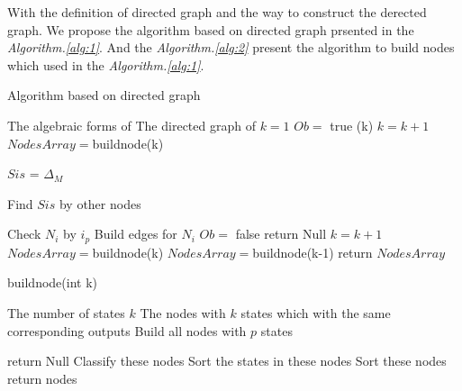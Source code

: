 With the definition of directed graph and the way to construct the derected graph. We propose the algorithm based on directed graph prsented in the {\em Algorithm.\ref{alg:1}}. And the {\em Algorithm.\ref{alg:2}} present the algorithm to build nodes which used in the {\em Algorithm.\ref{alg:1}}.

\begin{algorithm}[h]
\caption{Algorithm based on directed graph}
\begin{algorithmic}[1]
\REQUIRE 
The algebraic forms of \BCN
\ENSURE  
The directed graph of \BCN
\STATE  $k=1$ %
\STATE  $Ob=$ true %
(k)
\STATE $k= k+1$
\STATE $NodesArray=${\sf buildnode}(k)

\STATE $Sis$ = $\Delta_M$ 
\ELSE

\STATE Find $Sis$ by other nodes

\ENDIF
{}
\STATE Check $N_i$ by $i_p$
\STATE Build edges for $N_i$ 
\ENDFOR
{}
\STATE  $Ob=$ false 
\STATE return Null
\ENDIF
\ENDFOR
\STATE $k= k+1$
\STATE $NodesArray=${\sf buildnode}(k)
\ENDWHILE
\STATE $NodesArray=${\sf buildnode}(k-1)
\STATE return $NodesArray$
\end{algorithmic}
 \label{alg:1}
\end{algorithm}
\begin{algorithm}[h!]
\caption{{\sf buildnode}(int k)}
\begin{algorithmic}[1]
\REQUIRE 
The number of states $k$
\ENSURE  
The nodes with $k$ states which with the same corresponding outputs %
\STATE  Build all nodes with $p$ states %

\STATE  return Null
\ELSE 
\STATE  Classify these nodes
\STATE Sort the states in these nodes
\STATE Sort these nodes%
\STATE return nodes
\ENDIF 
\end{algorithmic}
 \label{alg:2}
\end{algorithm}

